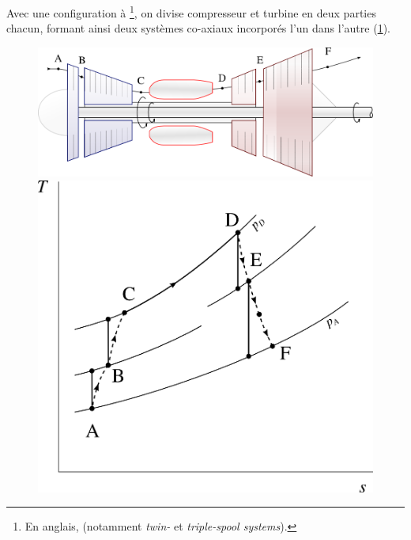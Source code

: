 {{		Avec une configuration à \footnote{En anglais,  (notamment \textit{twin-} et \textit{triple-spool systems}).}, on divise compresseur et turbine en deux parties chacun, formant ainsi deux systèmes co-axiaux incorporés l’un dans l’autre (\cref{fig_axes_multiples}).

		\begin{figure}
			\begin{center}
				\includegraphics[scale=0.6]{images/circuit_twin_spool.png}\vspace{0.5cm}
				\includegraphics[scale=0.8]{images/ts_gp_twin_spool.png}
			\end{center}
			\label{fig_axes_multiples}
		\end{figure}

}}
